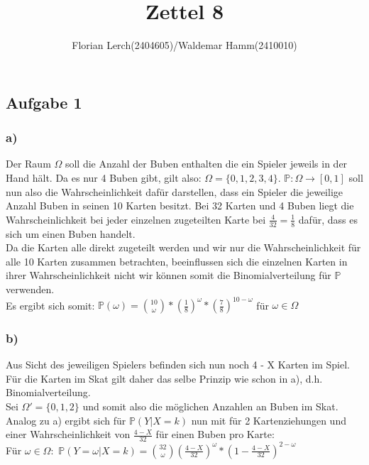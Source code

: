 \documentclass[11pt]{amsart}
\title{Zettel 8}
\author{Florian Lerch(2404605)/Waldemar Hamm(2410010)}
\begin{document}
\maketitle

\subsection{Aufgabe 1}

\subsubsection{a)}

Der Raum $\Omega$ soll die Anzahl der Buben enthalten die ein Spieler jeweils in der Hand hält. Da es nur 4
Buben gibt, gilt also: $\Omega = \{0,1,2,3,4\}$. $\mathbb{P}: \Omega \rightarrow [0,1]$ soll nun also  die Wahrscheinlichkeit
dafür darstellen, dass ein Spieler die jeweilige Anzahl Buben in seinen 10 Karten besitzt.
Bei 32 Karten und 4 Buben liegt die Wahrscheinlichkeit bei jeder einzelnen zugeteilten Karte bei $\frac{4}{32} =
\frac{1}{8}$ dafür, dass es sich um einen Buben handelt.\\
Da die Karten alle direkt zugeteilt werden und wir nur die Wahrscheinlichkeit für alle 10 Karten zusammen betrachten,
beeinflussen sich die einzelnen Karten in ihrer Wahrscheinlichkeit nicht wir können somit die Binomialverteilung
für $\mathbb{P}$ verwenden.\\
Es ergibt sich somit: $\mathbb{P}(\omega) = \binom{10}{\omega}*(\frac{1}{8})^{\omega}*(\frac{7}{8})^{10-\omega}$ für $\omega \in \Omega$

\subsubsection{b)}

Aus Sicht des jeweiligen Spielers befinden sich nun noch 4 - X Karten im Spiel. Für die Karten im Skat gilt
daher das selbe Prinzip wie schon in a), d.h. Binomialverteilung. \\
Sei $\Omega' = \{0,1,2\}$ und somit also die möglichen Anzahlen an Buben im Skat. \\
Analog zu a) ergibt sich für $\mathbb{P}(Y|X = k)$ nun mit für 2 Kartenziehungen und einer Wahrscheinlichkeit
von $\frac{4-X}{32}$ für einen Buben pro Karte:\\
Für $\omega \in \Omega:$ $\mathbb{P}(Y = \omega |X = k) = \binom{32}{\omega}(\frac{4-X}{32})^{\omega} * (1 - \frac{4-X}{32})^{2 - \omega}$
\end{document}
